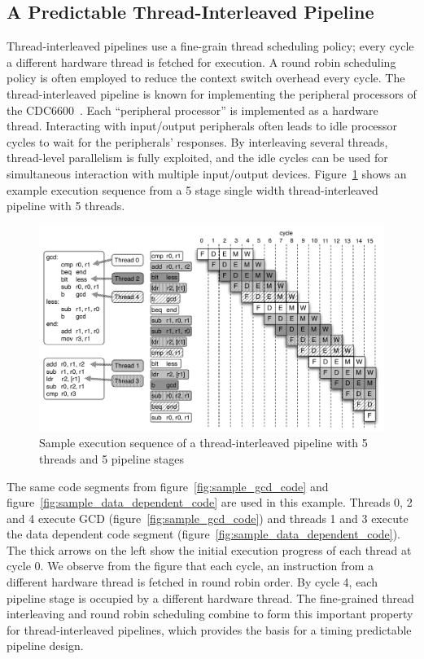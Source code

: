 \subsection{A Predictable Thread-Interleaved Pipeline}
\label{section:pret_thread_pipeline}
Thread-interleaved pipelines use a fine-grain thread scheduling policy; every cycle a different hardware thread is fetched for execution.
A round robin scheduling policy is often employed to reduce the context switch overhead every cycle.     
The thread-interleaved pipeline is known for implementing the peripheral processors of the CDC6600~\cite{CDC6600}.
Each ``peripheral processor'' is implemented as a hardware thread.     
Interacting with input/output peripherals often leads to idle processor cycles to wait for the peripherals' responses.
By interleaving several threads, thread-level parallelism is fully exploited, and the idle cycles can be used for simultaneous interaction with multiple input/output devices.       
Figure~\ref{fig:execution_thread_interleaved_pipeline} shows an example execution sequence from a 5 stage single width thread-interleaved pipeline with 5 threads.
\begin{figure}[h]
    \begin{center}
    \includegraphics[scale=.55]{figs/thread-interleaved-execution}
  \end{center}
  \vspace{-10pt}
  \caption{Sample execution sequence of a thread-interleaved pipeline with 5 threads and 5 pipeline stages}
  \label{fig:execution_thread_interleaved_pipeline}
\end{figure}

The same code segments from figure~\ref{fig:sample_gcd_code} and figure~\ref{fig:sample_data_dependent_code} are used in this example. 
Threads 0, 2 and 4 execute GCD (figure~\ref{fig:sample_gcd_code}) and threads 1 and 3 execute the data dependent code segment (figure~\ref{fig:sample_data_dependent_code}).
The thick arrows on the left show the initial execution progress of each thread at cycle 0.
We observe from the figure that each cycle, an instruction from a different hardware thread is fetched in round robin order.
By cycle 4, each pipeline stage is occupied by a different hardware thread.
The fine-grained thread interleaving and round robin scheduling combine to form this important property for thread-interleaved pipelines, which provides the basis for a timing predictable pipeline design.

